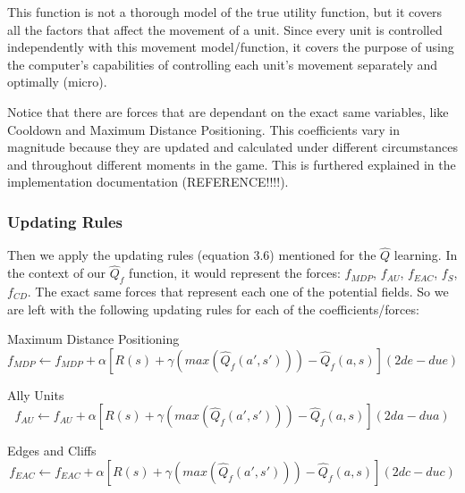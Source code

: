 This function is not a thorough model of the true utility function, but it covers all the factors that affect the movement of a unit. Since every unit is controlled independently with this movement model/function, it covers the purpose of using the computer's capabilities of controlling each unit's movement separately and optimally (micro).

Notice that there are forces that are dependant on the exact same variables, like Cooldown and Maximum Distance Positioning. This coefficients vary in magnitude because they are updated and calculated under different circumstances and throughout different moments in the game. This is furthered explained in the implementation documentation (REFERENCE!!!!). 

\subsubsection{Updating Rules}

Then we apply the updating rules (equation 3.6) mentioned for the $\hat{Q}$ learning. In the context of our  $\hat{Q}_f$ function, it would represent the forces: $f_{MDP}$, $f_{AU}$, $f_{EAC}$, $f_{S}$, $f_{CD}$. The exact same forces that represent each one of the potential fields. So we are left with the following updating rules for each of the coefficients/forces:

\begin{flushleft}
Maximum Distance Positioning 
\begin{equation}
f_{MDP}  \leftarrow f_{MDP}  + \alpha [ R(s) + \gamma (max(\hat{Q}_{f} (a',s')))-\hat{Q}_{f} (a,s) ](2de - due)
\end{equation}
\end{flushleft} 

\begin{flushleft}
Ally Units
\begin{equation}
f_{AU}  \leftarrow f_{AU} + \alpha [ R(s) + \gamma (max(\hat{Q}_{f} (a',s')))-\hat{Q}_{f} (a,s) ](2da - dua)
\end{equation}
\end{flushleft} 

\begin{flushleft}
Edges and Cliffs
\begin{equation}
f_{EAC}  \leftarrow f_{EAC}  + \alpha [ R(s) + \gamma (max(\hat{Q}_{f} (a',s')))-\hat{Q}_{f} (a,s) ] (2dc - duc)
\end{equation}
\end{flushleft} 


